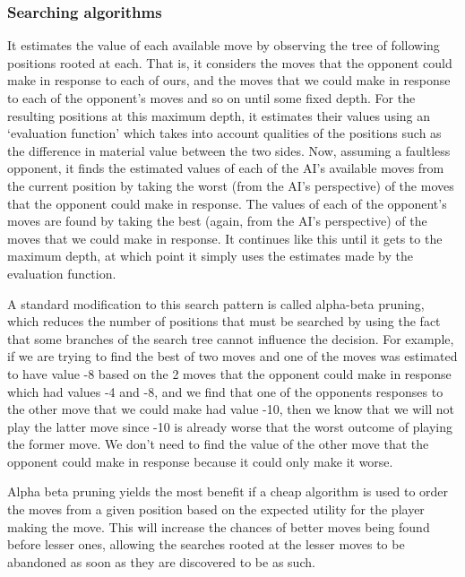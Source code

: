 \documentclass{l3proj}
\begin{document}
\subsubsection{Searching algorithms}

	 It estimates the value of
each available move by observing the tree of following positions rooted at each. That is, it
considers the moves that the opponent could make in response to each of ours, and the
moves that we could make in response to each of the opponent’s moves and so on until
some fixed depth. For the resulting positions at this maximum depth, it estimates their
values using an ‘evaluation function’ which takes into account qualities of the positions
such as the difference in material value between the two sides. Now, assuming a faultless
opponent, it finds the estimated values of each of the AI’s available moves from the
current position by taking the worst (from the AI’s perspective) of the moves that the
opponent could make in response. The values of each of the opponent’s moves are found
by taking the best (again, from the AI’s perspective) of the moves that we could make in
response. It continues like this until it gets to the maximum depth, at which point it simply
uses the estimates made by the evaluation function.

	A standard modification to this search pattern is called alpha-beta pruning, which reduces
the number of positions that must be searched by using the fact that some branches of the
search tree cannot influence the decision. For example, if we are trying to find the best of
two moves and one of the moves was estimated to have value -8 based on the 2 moves
that the opponent could make in response which had values -4 and -8, and we find that
one of the opponents responses to the other move that we could make had value -10, then
we know that we will not play the latter move since -10 is already worse that the worst
outcome of playing the former move. We don’t need to find the value of the other move
that the opponent could make in response because it could only make it worse.

	Alpha beta pruning yields the most benefit if a cheap algorithm is used to order the moves
from a given position based on the expected utility for the player making the move. This
will increase the chances of better moves being found before lesser ones, allowing the
searches rooted at the lesser moves to be abandoned as soon as they are discovered to be
as such.
\end{document}
